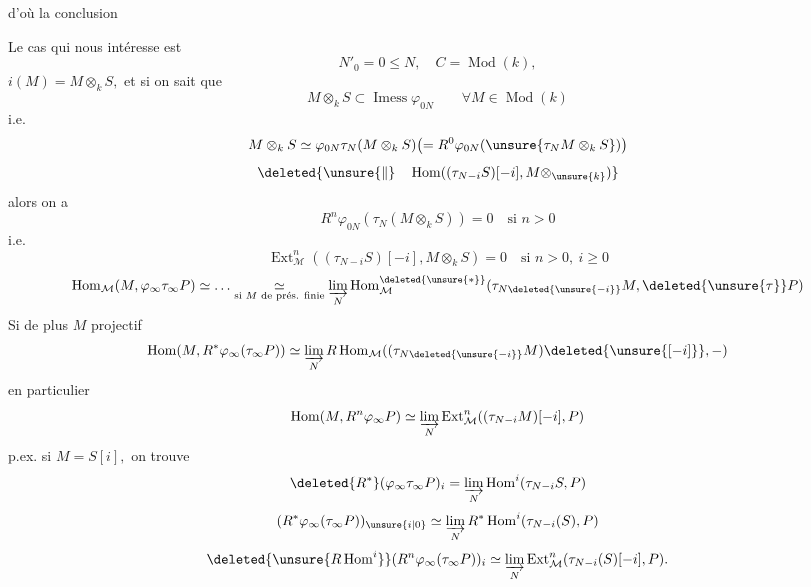 d'où la conclusion

Le cas qui nous intéresse est
\[
N'_0=0\leq N,\quad C=\operatorname{Mod}(k),
\]
\(i(M)=M\otimes_k S,\) et si on sait que
\[
M\otimes_k S\subset\operatorname{Imess}\varphi_{0N}\qquad\forall M\in\operatorname{Mod}(k)
\]
i.e.
\[
M\otimes_k S\simeq\varphi_{0N}\tau_N(M\otimes_k S)
\bigl(=R^0\varphi_{0N}(\unsure{\tau_N M\otimes_k S})\bigr)
\]
\[
\deleted{\unsure{\Vert}\quad\operatorname{Hom}((\tau_{N-i}S)[-i],M\otimes_{\unsure{k}})}
\]
alors on a
\[
R^n\varphi_{0N}(\tau_N(M\otimes_k S))=0\quad\text{si }n>0
\]
i.e.
\[
\boxed{\operatorname{Ext}^n_{\mathcal M}((\tau_{N-i}S)[-i],M\otimes_k S)=0\quad\text{si }n>0,\ i\geq0}
\]
\[
\operatorname{Hom}_{\mathcal M}(M,\varphi_\infty\tau_\infty P)\simeq\ldots
\underset{\text{si }M\text{ de prés. finie}}{\simeq}
\varinjlim_N\operatorname{Hom}_{\mathcal M}^{\deleted{\unsure{*}}}(\tau_{N\deleted{\unsure{-i}}}M,\deleted{\unsure{\tau}}P)
\]
Si de plus \(M\) projectif
\[
\operatorname{Hom}(M,R^*\varphi_\infty(\tau_\infty P))\simeq
\varinjlim_N R\operatorname{Hom}_{\mathcal M}((\tau_{N\deleted{\unsure{-i}}}M)\deleted{\unsure{[-i]}},-)
\]
en particulier
\[
\operatorname{Hom}(M,R^n\varphi_\infty P)\simeq
\varinjlim_N\operatorname{Ext}_{\mathcal M}^n((\tau_{N-i}M)[-i],P)
\]
p.ex. si \(M=S[i],\) on trouve
\[
\deleted{R^*}(\varphi_\infty\tau_\infty P)_i=
\varinjlim_N\operatorname{Hom}^i(\tau_{N-i}S,P)
\]
\[
(R^*\varphi_\infty(\tau_\infty P))_{\unsure{i|0}}\simeq
\varinjlim_N R^*\operatorname{Hom}^i(\tau_{N-i}(S),P)
\]
\[
\deleted{\unsure{R\operatorname{Hom}^i}}
(R^n\varphi_\infty(\tau_\infty P))_i\simeq
\varinjlim_N\operatorname{Ext}_{\mathcal M}^n(\tau_{N-i}(S)[-i],P).
\]
